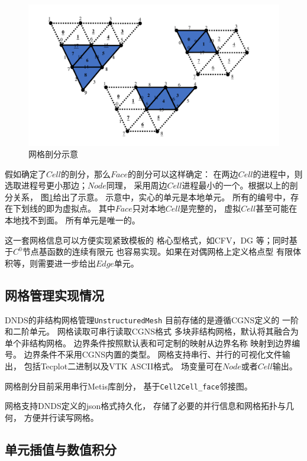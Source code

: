 \documentclass[UTF8,zihao=5]{ctexart} %
\begin{document}
\begin{figure}[htbp]
    \centering
    \includegraphics[width=12cm]{mesh_A_Part.pdf} 
    \caption{网格剖分示意}
    \label{fig:mesh_A_Part}
\end{figure}

假如确定了$Cell$的剖分，那么$Face$的剖分可以这样确定：
在两边$Cell$的进程中，则选取进程号更小那边；$Node$同理，
采用周边$Cell$进程最小的一个。根据以上的剖分关系，
图\ref{fig:mesh_A_Part}给出了示意。
示意中，实心的单元是本地单元。
所有的编号中，存在下划线的即为虚拟点。
其中$Face$只对本地$Cell$是完整的，
虚拟$Cell$甚至可能在本地找不到面。
所有单元是唯一的。

这一套网格信息可以方便实现紧致模板的
格心型格式，如CFV，DG
等；同时基于$C^0$节点基函数的连续有限元
也容易实现。如果在对偶网格上定义格点型
有限体积等，则需要进一步给出$Edge$单元。

\subsection{网格管理实现情况}

DNDS的非结构网格管理\verb|UnstructuredMesh|
目前存储的是遵循CGNS定义的
一阶和二阶单元。
网格读取可串行读取CGNS格式
多块非结构网格，默认将其融合为单个非结构网格。
边界条件按照默认表和可定制的映射从边界名称
映射到边界编号。
边界条件不采用CGNS内置的类型。
网格支持串行、并行的可视化文件输出，
包括Tecplot二进制以及VTK ASCII格式。
场变量可在$Node$或者$Cell$输出。

网格剖分目前采用串行Metis库剖分，
基于\verb|Cell2Cell_face|邻接图。

网格支持DNDS定义的json格式持久化，
存储了必要的并行信息和网格拓扑与几何，
方便并行读写网格。

\subsection{单元插值与数值积分}
\end{document}
